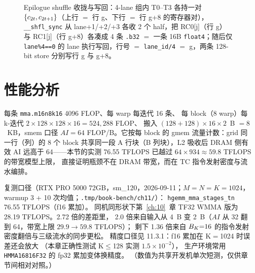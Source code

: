 \begin{figure}[H]
\caption{Epilogue shuffle 收拢与写回：4-lane 组内 T0--T3 各持一对 $\{c\sb{2t},c\sb{2t+1}\}$（上行 $=$ 行 g、下行 $=$ 行 g{+}8 的寄存器对），\texttt{\_\_shfl\_sync} 从 lane+1/+2/+3 各收 2 个 half，把 RC0[j]（行 g）与 RC1[j]（行 g{+}8）各凑成 4 条 \texttt{.b32} $=$ 一条 16B \texttt{float4}；随后仅 \texttt{lane\%4==0} 的 lane 执行写回，行号 $=$ \texttt{lane\_id/4} $=$ g，两条 128-bit store 分别写行 g 与 g{+}8。}
\label{fig:11-epilogue-shuffle}
\end{figure}
\section{性能分析}

每条 \texttt{mma.\allowbreak{}m16n8k16} 4096 FLOP、每 warp 每迭代 16 条、
每 block（8 warp）每 k-迭代 $2\times128\times128\times16 = 524{,}288$ FLOP、
搬入 $(128{+}128)\times16\times2$~B $= 8$~KB，smem 口径
$AI = 64$ FLOP/B。它按每 block 的 gmem 流量计数：grid 同一行（列）的
8 个 block 共享同一段
A 行块（B 列块），L2 吸收后 DRAM 侧有效 AI 远高于 64——本节的实测
76.55 TFLOPS 已越过 $64\times934 \approx 59.8$ TFLOPS 的带宽模型上限，
直接证明瓶颈不在 DRAM 带宽，而在 TC 指令发射密度与流水编排。

复测口径（RTX PRO 5000 72GB，sm\_120，2026-09-11；$M{=}N{=}K{=}1024$，
warmup 3 + 10 次均值；\texttt{.\allowbreak{}tmp/\allowbreak{}book-bench/\allowbreak{}ch11/\allowbreak{}}）：
\texttt{hgemm\_\allowbreak{}mma\_\allowbreak{}stages\_\allowbreak{}tn} 76.55 TFLOPS（f16 累加）。
同机同形状下第~\ref{ch:10}~章 TF32 WMMA 版为 28.19 TFLOPS。2.72 倍的差距里，
2.0 倍来自输入从 4~B 变 2~B（$AI$ 从 32 翻到 64，带宽上限 $29.9 \to 59.8$ TFLOPS）；
剩下 1.36 倍来自 $B\sb K{=}16$ 的指令发射密度翻倍与三级流水的同步更松。
精度口径见 11.3.1：f16 累加在 K$=$1024 时误差还会放大
（本章正确性测试 K$\le$128 实测 $1.5\times10^{-2}$），
生产环境常用 \texttt{HMMA16816\allowbreak{}F32} 的 fp32 累加变体换精度。
（数值为共享开发机单次短测，仅供章节间相对对照。）

